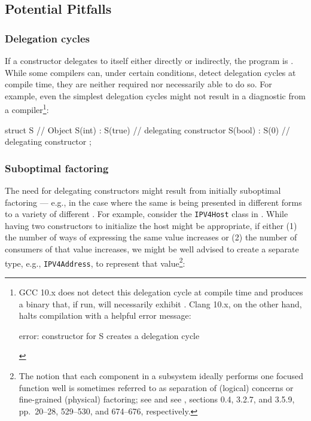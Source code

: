 \subsection[Potential Pitfalls]{Potential Pitfalls}\label{ctordelegrating-potential-pitfalls}

\subsubsection[Delegation cycles]{Delegation cycles}\label{delegation-cycles}

If a constructor delegates to itself either directly or indirectly, the
program is . While some compilers can, under certain conditions, detect delegation cycles at compile time, they are neither 
required nor necessarily able to do so. For example, even the simplest delegation cycles might not result in a diagnostic from a compiler{\cprotect\footnote{GCC 10.x does not detect this delegation
cycle at compile time and produces a binary that, if run, will
necessarily exhibit . Clang 10.x, on the
other hand, halts compilation with a helpful error message:

\begin{emcppslisting}[style=plain, basicstyle={\ttfamily\footnotesize}]
error: constructor for S creates a delegation cycle
\end{emcppslisting}\vspace*{-1ex}
      }}:

\begin{emcppslisting}[language=C++]
struct S  // Object
{
    S(int)  : S(true) { }  // delegating constructor
    S(bool) : S(0)    { }  // delegating constructor
};
\end{emcppslisting}
    
\subsubsection[Suboptimal factoring]{Suboptimal factoring}\label{suboptimal-factoring}

The need for delegating constructors might result from initially
suboptimal factoring --- e.g., in the case where the same 
is being presented in different forms to a variety of different
. For example, consider the \lstinline!IPV4Host! class
in . %
While having two constructors to
initialize the host might be appropriate, if either (1) the number of
ways of expressing the same value increases or (2) the number of
consumers of that value increases, we might be well advised to create a
separate  type, e.g., \lstinline!IPV4Address!, to
represent that value{\cprotect\footnote{The notion that each component
in a subsystem ideally performs one focused function well is sometimes
referred to as separation of (logical) concerns or
  fine-grained (physical) factoring; see \cite{dijkstra82} and see \cite{lakos20},
  sections 0.4, 3.2.7, and 3.5.9, pp.~20--28, 529--530, and 674--676,
  respectively.}}:


